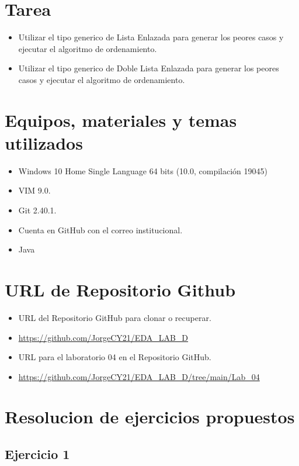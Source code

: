 \documentclass{article}
\begin{document}
	
	\section{Tarea}
	\begin{itemize}
		\item Utilizar el tipo generico de Lista Enlazada para generar los peores casos y ejecutar el	algoritmo de ordenamiento.
		\item Utilizar el tipo generico de Doble Lista Enlazada para generar los peores casos y ejecutar el algoritmo de ordenamiento.	
	\end{itemize}
	
	
	\section{Equipos, materiales y temas utilizados}
	\begin{itemize}
		\item Windows 10 Home Single Language 64 bits (10.0, compilación 19045)
		\item VIM 9.0.
		\item Git 2.40.1.
		\item Cuenta en GitHub con el correo institucional.
		\item Java
	\end{itemize}
	
	\section{URL de Repositorio Github}
	\begin{itemize}
		\item URL del Repositorio GitHub para clonar o recuperar.
		\item \url{https://github.com/JorgeCY21/EDA_LAB_D}
		\item URL para el laboratorio 04 en el Repositorio GitHub.
		\item \url{https://github.com/JorgeCY21/EDA_LAB_D/tree/main/Lab_04}
	\end{itemize}
	
	
	\section{Resolucion de ejercicios propuestos}	
	
	\subsection{Ejercicio 1}
	
\end{document}
